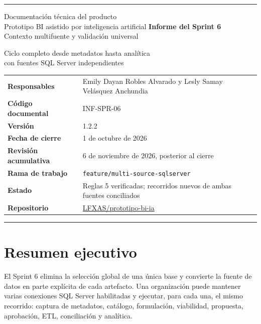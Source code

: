 \documentclass[11pt,letterpaper]{article}
\newcommand{\file}[1]{\texttt{#1}}
\begin{document}
\hypersetup{pageanchor=false}
\begin{titlepage}
  \thispagestyle{empty}
  \vspace*{0.8cm}
  {\color{ugblue}\rule{\textwidth}{2.8pt}}
  \vspace{1.2cm}
  {\Large Documentación técnica del producto\\[0.25em]
  Prototipo BI asistido por inteligencia artificial}
  \vfill
  {\color{deepgreen}\fontsize{28}{34}\selectfont\textbf{Informe del Sprint 6}}\\[0.7em]
  {\LARGE Contexto multifuente y validación universal}\\[0.6em]
  {\large Ciclo completo desde metadatos hasta analítica\\
  con fuentes SQL Server independientes\par}
  \vspace{1.4cm}
  \begin{tabularx}{\textwidth}{@{}>{\bfseries}l X@{}}
    Responsables & Emily Dayan Robles Alvarado y Lesly Samay Velásquez Anchundia \\
    Código documental & INF-SPR-06 \\
    Versión & 1.2.2 \\
    Fecha de cierre & 1 de octubre de 2026 \\
    Revisión acumulativa & 6 de noviembre de 2026, posterior al cierre \\
    Rama de trabajo & \file{feature/multi-source-sqlserver} \\
    Estado & Reglas 5 verificadas; recorridos nuevos de ambas fuentes conciliados \\
    Repositorio & \href{https://github.com/LFXAS/prototipo-bi-ia}{LFXAS/prototipo-bi-ia} \\
  \end{tabularx}
  \vfill
  {\color{ugblue}\rule{\textwidth}{2.8pt}}
\end{titlepage}
\hypersetup{pageanchor=true}
\tableofcontents
\newpage
{}

\section{Resumen ejecutivo}

El Sprint 6 elimina la selección global de una única base y convierte la fuente de datos
en parte explícita de cada artefacto. Una organización puede mantener varias conexiones
SQL Server habilitadas y ejecutar, para cada una, el mismo recorrido: captura de metadatos,
catálogo, formulación, viabilidad, propuesta, aprobación, ETL, conciliación y analítica.
\end{document}
